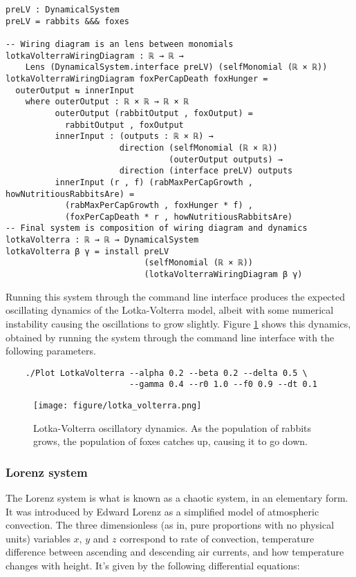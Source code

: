 \begin{verbatim}
preLV : DynamicalSystem
preLV = rabbits &&& foxes

-- Wiring diagram is an lens between monomials
lotkaVolterraWiringDiagram : ℝ → ℝ → 
    Lens (DynamicalSystem.interface preLV) (selfMonomial (ℝ × ℝ))
lotkaVolterraWiringDiagram foxPerCapDeath foxHunger = 
  outerOutput ⇆ innerInput
    where outerOutput : ℝ × ℝ → ℝ × ℝ
          outerOutput (rabbitOutput , foxOutput) = 
            rabbitOutput , foxOutput
          innerInput : (outputs : ℝ × ℝ) → 
                       direction (selfMonomial (ℝ × ℝ)) 
                                 (outerOutput outputs) →
                       direction (interface preLV) outputs
          innerInput (r , f) (rabMaxPerCapGrowth , howNutritiousRabbitsAre) = 
            (rabMaxPerCapGrowth , foxHunger * f) , 
            (foxPerCapDeath * r , howNutritiousRabbitsAre)
-- Final system is composition of wiring diagram and dynamics
lotkaVolterra : ℝ → ℝ → DynamicalSystem
lotkaVolterra β γ = install preLV 
                            (selfMonomial (ℝ × ℝ))
                            (lotkaVolterraWiringDiagram β γ)
\end{verbatim}

Running this system through the command line interface produces the expected oscillating dynamics of the Lotka-Volterra model, albeit with some numerical instability causing the oscillations to grow slightly. Figure \ref{fig:lvfig} shows this dynamics, obtained by running the system through the command line interface with the following parameters.

\begin{verbatim}
    ./Plot LotkaVolterra --alpha 0.2 --beta 0.2 --delta 0.5 \
                         --gamma 0.4 --r0 1.0 --f0 0.9 --dt 0.1
    \end{verbatim}

\begin{figure}[H]
    \centering
    \texttt{[image: figure/lotka\_volterra.png]}
    \caption{Lotka-Volterra oscillatory dynamics. As the population of rabbits grows, the population of foxes catches up, causing it to go down.}
    \label{fig:lvfig}
\end{figure}


\subsubsection{Lorenz system}
The Lorenz system\cite{lorenz1963} is what is known as a chaotic system, in an elementary form. It was introduced by Edward Lorenz as a simplified model of atmospheric convection. The three dimensionless (as in, pure proportions with no physical units) variables $x$, $y$ and $z$ correspond to rate of convection, temperature difference between ascending and descending air currents, and how temperature changes with height. It's given by the following differential equations:

